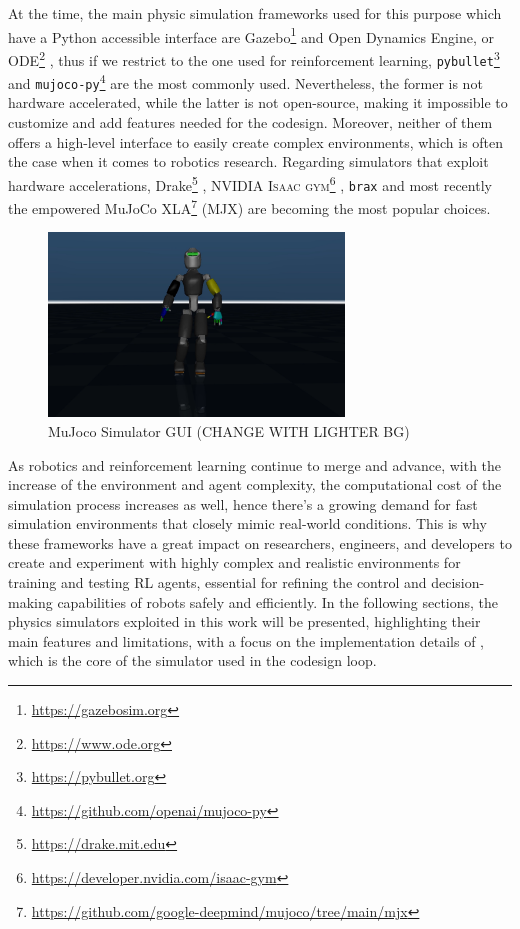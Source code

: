 At the time, the main physic simulation frameworks used for this purpose which have a Python accessible interface are Gazebo\footnote{\url{https://gazebosim.org}} \citep{Koenig2004} and Open Dynamics Engine, or ODE\footnote{\url{https://www.ode.org}}\citep{ode:2008} \citep{erez_simulation_2015,ivaldi:hal-01116148}, thus if we restrict to the one used for reinforcement learning, \texttt{pybullet}\footnote{\url{https://pybullet.org}}\citep{coumans_pybullet_2016} and \texttt{mujoco-py}\footnote{\url{https://github.com/openai/mujoco-py}}\citep{todorov_mujoco_2012} are the most commonly used. Nevertheless, the former is not hardware accelerated, while the latter is not open-source, making it impossible to customize and add features needed for the codesign. Moreover, neither of them offers a high-level interface to easily create complex environments, which is often the case when it comes to robotics research.
Regarding simulators that exploit hardware accelerations, Drake\footnote{\url{https://drake.mit.edu}}
\citep{drake}, NVIDIA \textsc{Isaac gym}\footnote{\url{https://developer.nvidia.com/isaac-gym}} \citep{makoviychuk_isaac_2021}, \texttt{brax} \citep{freeman_brax_2021} and most recently the \jax empowered MuJoCo XLA\footnote{\url{https://github.com/google-deepmind/mujoco/tree/main/mjx}} (MJX) are becoming the most popular choices.

\begin{figure}
    \centering
    \caption{MuJoco Simulator GUI (CHANGE WITH LIGHTER BG)}
    \label{fig:mujoco}
    \includegraphics[width=0.7\textwidth]{Images/mujoco_ergocub.png}
\end{figure}

As robotics and reinforcement learning continue to merge and advance, with the increase of the environment and agent complexity, the computational cost of the simulation process increases as well, hence there's a growing demand for fast simulation environments that closely mimic real-world conditions. This is why these frameworks have a great impact on researchers, engineers, and developers to create and experiment with highly complex and realistic environments for training and testing \ac{RL} agents, essential for refining the control and decision-making capabilities of robots safely and efficiently. In the following sections, the physics simulators exploited in this work will be presented, highlighting their main features and limitations, with a focus on the implementation details of \jax, which is the core of the simulator used in the codesign loop.

